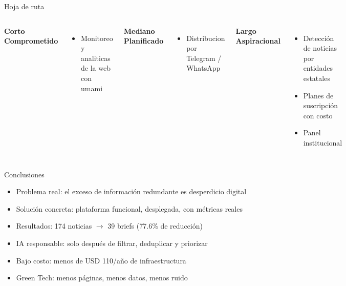 \documentclass[10pt,xcolor={dvipsnames}]{beamer}
\begin{document}
\begin{frame}{Hoja de ruta}

\begin{columns}[T]
\centering\bfseries\color{verde-ecobrief} Corto\\[4pt]
\small Comprometido
\vspace{0.2cm}

\small
\begin{itemize}
    \item Monitoreo y analiticas de la web con umami
\end{itemize}

\centering\bfseries\color{verde-ecobrief} Mediano\\[4pt]
\small Planificado
\vspace{0.2cm}

\small
\begin{itemize}
    \item Distribucion por Telegram / WhatsApp
\end{itemize}

\centering\bfseries\color{verde-ecobrief} Largo\\[4pt]
\small Aspiracional
\vspace{0.2cm}

\small
\begin{itemize}
    \item Detección de noticias por entidades estatales
    \item Planes de suscripción con costo
    \item Panel institucional
\end{itemize}
\end{columns}
\end{frame}

\begin{frame}{Conclusiones}

\begin{itemize}
    \item \alert{Problema real:} el exceso de información redundante es desperdicio digital
    \item \alert{Solución concreta:} plataforma funcional, desplegada, con métricas reales
    \item \alert{Resultados:} 174 noticias $\to$ 39 briefs (77.6\% de reducción)
    \item \alert{IA responsable:} solo después de filtrar, deduplicar y priorizar
    \item \alert{Bajo costo:} menos de USD 110/año de infraestructura
    \item \alert{Green Tech:} menos páginas, menos datos, menos ruido
\end{itemize}

\vspace{0.4cm}
\begin{center}
\end{center}
\end{frame}
\end{document}
